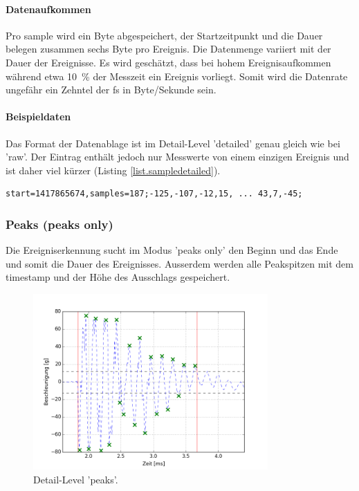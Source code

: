 \paragraph{Datenaufkommen} Pro \gls{sample} wird ein Byte abgespeichert, der Startzeitpunkt und die Dauer belegen zusammen sechs Byte pro Ereignis. Die Datenmenge variiert mit der Dauer der Ereignisse. Es wird geschätzt, dass bei hohem Ereignisaufkommen während etwa 10~\% der Messzeit ein Ereignis vorliegt. Somit wird die Datenrate ungefähr ein Zehntel der \gls{fs} in Byte/Sekunde sein.

\paragraph{Beispieldaten} Das Format der Datenablage ist im Detail-Level 'detailed' genau gleich wie bei 'raw'. Der Eintrag enthält jedoch nur Messwerte von einem einzigen Ereignis und ist daher viel kürzer (Listing \ref{list.sampledetailed}).

\begin{lstlisting}[caption=Beispieldaten auf Detail-Level 'detailed', label=list.sampledetailed]
start=1417865674,samples=187;-125,-107,-12,15, ... 43,7,-45;
\end{lstlisting}


\subsubsection{Peaks (peaks only)}
Die Ereigniserkennung sucht im Modus 'peaks only' den Beginn und das Ende und somit die Dauer des Ereignisses. Ausserdem werden alle Peakspitzen mit dem \gls{timestamp} und der Höhe des Ausschlags gespeichert.
\begin{figure}
	\centering
		\includegraphics[width=0.8\textwidth]{images/peaks.png}
	\caption{Detail-Level 'peaks'.}
	\label{fig.detailpeaks}
\end{figure}

